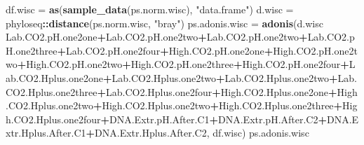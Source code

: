\documentclass[]{article}
\newenvironment{Shaded}{\begin{snugshade}}{\end{snugshade}}
\newcommand{\KeywordTok}[1]{\textcolor[rgb]{0.13,0.29,0.53}{\textbf{#1}}}
\newcommand{\NormalTok}[1]{#1}
\newcommand{\OperatorTok}[1]{\textcolor[rgb]{0.81,0.36,0.00}{\textbf{#1}}}
\newcommand{\StringTok}[1]{\textcolor[rgb]{0.31,0.60,0.02}{#1}}
\begin{document}
\begin{Shaded}
\begin{Highlighting}[]
\NormalTok{df.wisc =}\StringTok{ }\KeywordTok{as}\NormalTok{(}\KeywordTok{sample_data}\NormalTok{(ps.norm.wisc), }\StringTok{"data.frame"}\NormalTok{)}
\NormalTok{d.wisc =}\StringTok{ }\NormalTok{phyloseq}\OperatorTok{::}\KeywordTok{distance}\NormalTok{(ps.norm.wisc, }\StringTok{"bray"}\NormalTok{) }
\NormalTok{ps.adonis.wisc =}\StringTok{ }\KeywordTok{adonis}\NormalTok{(d.wisc }\OperatorTok{~}\StringTok{ }\NormalTok{Lab.CO2.pH.one2one}\OperatorTok{+}\NormalTok{Lab.CO2.pH.one2two}\OperatorTok{+}\NormalTok{Lab.CO2.pH.one2two}\OperatorTok{+}\NormalTok{Lab.CO2.pH.one2three}\OperatorTok{+}\NormalTok{Lab.CO2.pH.one2four}\OperatorTok{+}\NormalTok{High.CO2.pH.one2one}\OperatorTok{+}\NormalTok{High.CO2.pH.one2two}\OperatorTok{+}\NormalTok{High.CO2.pH.one2two}\OperatorTok{+}\NormalTok{High.CO2.pH.one2three}\OperatorTok{+}\NormalTok{High.CO2.pH.one2four}\OperatorTok{+}\NormalTok{Lab.CO2.Hplus.one2one}\OperatorTok{+}\NormalTok{Lab.CO2.Hplus.one2two}\OperatorTok{+}\NormalTok{Lab.CO2.Hplus.one2two}\OperatorTok{+}\NormalTok{Lab.CO2.Hplus.one2three}\OperatorTok{+}\NormalTok{Lab.CO2.Hplus.one2four}\OperatorTok{+}\NormalTok{High.CO2.Hplus.one2one}\OperatorTok{+}\NormalTok{High.CO2.Hplus.one2two}\OperatorTok{+}\NormalTok{High.CO2.Hplus.one2two}\OperatorTok{+}\NormalTok{High.CO2.Hplus.one2three}\OperatorTok{+}\NormalTok{High.CO2.Hplus.one2four}\OperatorTok{+}\NormalTok{DNA.Extr.pH.After.C1}\OperatorTok{+}\NormalTok{DNA.Extr.pH.After.C2}\OperatorTok{+}\NormalTok{DNA.Extr.Hplus.After.C1}\OperatorTok{+}\NormalTok{DNA.Extr.Hplus.After.C2, df.wisc)}
\NormalTok{ps.adonis.wisc}
\end{Highlighting}
\end{Shaded}
\end{document}
